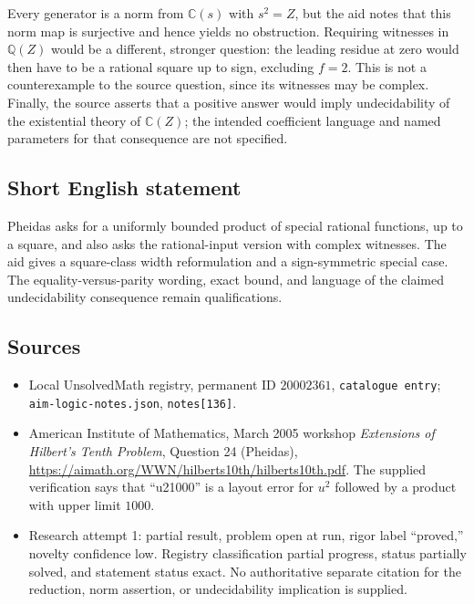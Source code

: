 \documentclass[11pt]{article}
\newcommand{\Q}{\mathbb{Q}}
\newcommand{\C}{\mathbb{C}}
\begin{document}
Every generator is a norm from $\C(s)$ with $s^2=Z$, but the aid notes that this norm map is surjective and hence yields no obstruction. Requiring witnesses in $\Q(Z)$ would be a different, stronger question: the leading residue at zero would then have to be a rational square up to sign, excluding $f=2$. This is not a counterexample to the source question, since its witnesses may be complex. Finally, the source asserts that a positive answer would imply undecidability of the existential theory of $\C(Z)$; the intended coefficient language and named parameters for that consequence are not specified.
\subsection{Short English statement}
Pheidas asks for a uniformly bounded product of special rational functions, up to a square, and also asks the rational-input version with complex witnesses. The aid gives a square-class width reformulation and a sign-symmetric special case. The equality-versus-parity wording, exact bound, and language of the claimed undecidability consequence remain qualifications.
\subsection{Sources}
\begin{itemize}
\item Local UnsolvedMath registry, permanent ID $20002361$, \texttt{catalogue entry}; \texttt{aim-logic-notes.json}, \texttt{notes[136]}.
\item American Institute of Mathematics, March 2005 workshop \emph{Extensions of Hilbert's Tenth Problem}, Question 24 (Pheidas), \url{https://aimath.org/WWN/hilberts10th/hilberts10th.pdf}. The supplied verification says that ``u21000'' is a layout error for $u^2$ followed by a product with upper limit $1000$.
\item Research attempt 1: partial result, problem open at run, rigor label ``proved,'' novelty confidence low. Registry classification partial progress, status partially solved, and statement status exact. No authoritative separate citation for the reduction, norm assertion, or undecidability implication is supplied.
\end{itemize}
\end{document}
